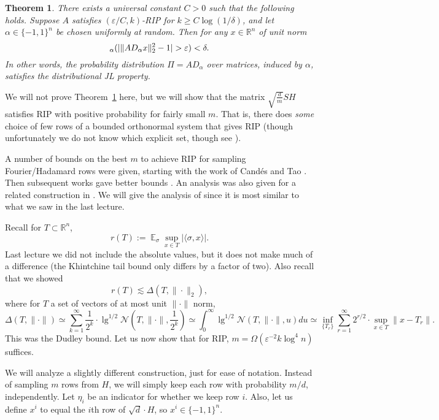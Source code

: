 \documentclass[11pt]{article}
\DeclareMathOperator*{\E}{\mathbb{E}}
\let\Pr\relax
\DeclareMathOperator*{\Pr}{\mathbb{P}}
\newcommand{\eps}{\varepsilon}
\newcommand{\inprod}[1]{\langle #1 \rangle}
\newcommand{\R}{\mathbb{R}}
\newtheorem{theorem}{Theorem}
\newcommand{\TheoremName}[1]{\label{thm:#1}}
\newcommand{\Theorem}[1]{Theorem~\ref{thm:#1}}
\begin{document}
\begin{theorem}\TheoremName{kw}
	There exists a universal constant $C>0$ such that the following holds. Suppose $A$ satisfies $(\eps/C, k)$-RIP for $k \ge C\log(1/\delta)$, and let $\alpha \in \{-1,1\}^n$ be chosen uniformly at random. Then for any $x\in\R^n$ of unit norm
	$$
	\Pr_\alpha (| \|A D_\alpha x\|_2^2 - 1 | > \eps) < \delta .
	$$
	In other words, the probability distribution $\Pi = AD_\alpha$ over matrices, induced by $\alpha$, satisfies the distributional JL property.
\end{theorem}

We will not prove \Theorem{kw} here, but we will show that the matrix $\sqrt{\frac dm}SH$ satisfies RIP with positive probability for fairly small $m$. That is, there does {\em some} choice of few rows of a bounded orthonormal system that gives RIP (though unfortunately we do not know which explicit set, though see \cite{BourgainDFKK11}).

A number of bounds on the best $m$ to achieve RIP for sampling Fourier/Hadamard rows were given, starting with the work of Cand\'{e}s and Tao \cite{CandesT06}. Then subsequent works gave better bounds \cite{RudelsonV08,Bourgain14,HavivR16}. An analysis was also given for a related construction in \cite{NelsonPW14}. We will give the analysis of \cite{RudelsonV08} since it is most similar to what we saw in the last lecture.

Recall for $T\subset \R^n$,
$$
r(T) := \E_\sigma \sup_{x\in T} |\inprod{\sigma, x}| .
$$
Last lecture we did not include the absolute values, but it does not make much of a difference (the Khintchine tail bound only differs by a factor of two). Also recall that we showed
$$
r(T) \lesssim \Delta(T, \|\cdot\|_2) ,
$$
where for $T$ a set of vectors of at most unit $\|\cdot\|$ norm,
$$
\Delta(T, \|\cdot\|) \simeq \sum_{k=1}^\infty \frac 1{2^k}\cdot \lg^{1/2}\mathcal N(T, \|\cdot\|, \frac 1{2^k}) \simeq \int_0^\infty \lg^{1/2} \mathcal N(T, \|\cdot\|, u)du \simeq \inf_{\{T_r\}} \sum_{r=1}^\infty 2^{r/2}\cdot \sup_{x\in T} \|x - T_r\| .
$$
This was the Dudley bound. Let us now show that for RIP, $m = \Omega(\eps^{-2}k\log^4 n)$ suffices.

We will analyze a slightly different construction, just for ease of notation. Instead of sampling $m$ rows from $H$, we will simply keep each row with probability $m/d$, independently. Let $\eta_i$ be an indicator for whether we keep row $i$. Also, let us define $x^i$ to equal the $i$th row of $\sqrt d \cdot H$, so $x^i \in \{-1,1\}^n$.
\end{document}
